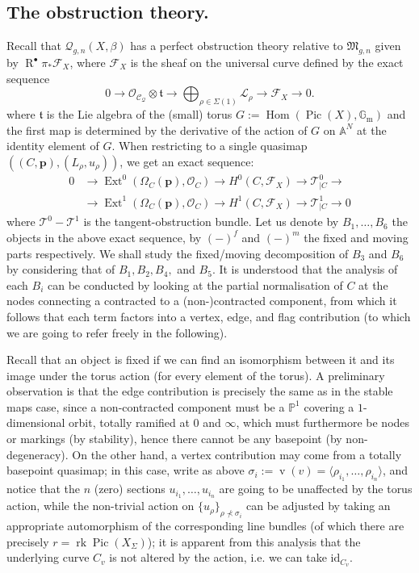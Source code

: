 \documentclass[11pt]{amsart}
\newcommand{\Q}[4]{\mathcal{Q}_{#1,#2}(#3,#4)}
\newcommand{\PP}{\mathbb P}
\newcommand{\OO}{\mathcal{O}}
\renewcommand{\to}{\rightarrow}
\newcommand{\F}{\mathcal F}
\newcommand{\Aaff}{\mathbb{A}}
\newcommand{\Pic}{\operatorname{Pic}}
\newcommand{\Hom}{\operatorname{Hom}}
\newcommand{\Ext}{\operatorname{Ext}}
\newcommand{\Gm}{\mathbb{G}_{\text{m}}}
\newcommand{\R}{\operatorname{R}^{\bullet}}
\newcommand{\rk}{\operatorname{rk}}
\newcommand{\vv}{\operatorname{v}}
\newcommand{\id}{\mathrm{id}}
\theoremstyle{definition}
\theoremstyle{definition}
\begin{document}
\subsection{The obstruction theory.} Recall that $\Q{g}{n}{X}{\beta}$ has a perfect obstruction theory relative to $\mathfrak M_{g,n}$ given by $\R\pi_*\F_X$, where $\F_X$ is the sheaf on the universal curve defined by the exact sequence
\begin{equation}\label{eqn:F}
 0\to\OO_{\mathcal C_\mathcal Q}\otimes \mathfrak t\to\bigoplus_{\rho\in\Sigma(1)}\mathcal L_\rho\to\F_X\to 0.
\end{equation}
where $\mathfrak t$ is the Lie algebra of the (small) torus $G:=\Hom(\Pic(X),\Gm)$ and the first map is determined by the derivative of the action of $G$ on $\Aaff^N$ at the identity element of $G$.
When restricting to a single quasimap $\left((C,\mathbf p),(L_{\rho},u_{\rho})\right)$, we get an exact sequence:
\begin{align*}
 0&\to \Ext^0(\Omega_C(\mathbf p),\OO_C)\to H^0(C,\F_X)\to \mathcal T^0_{|C}\to \\
  &\to \Ext^1(\Omega_C(\mathbf p),\OO_C)\to H^1(C,\F_X)\to \mathcal T^1_{|C}\to 0
\end{align*}
where $\mathcal T^0-\mathcal T^1$ is the tangent-obstruction bundle.
Let us denote by $B_1,\ldots, B_6$ the objects in the above exact sequence, by $(-)^f$ and $(-)^m$ the fixed and moving parts respectively. We shall study the fixed/moving decomposition of $B_3$ and $B_6$ by considering that of $B_1, B_2, B_4,$ and $B_5$. It is understood that the analysis of each $B_i$ can be conducted by looking at the partial normalisation of $C$ at the nodes connecting a contracted to a (non-)contracted component, from which it follows that each term factors into a vertex, edge, and flag contribution (to which we are going to refer freely in the following). 

Recall that an object is fixed if we can find an isomorphism between it and its image under the torus action (for every element of the torus). A preliminary observation is that the edge contribution is precisely the same as in the stable maps case, since a non-contracted component must be a $\PP^1$ covering a $1$-dimensional orbit, totally ramified at $0$ and $\infty$, which must furthermore be nodes or markings (by stability), hence there cannot be any basepoint (by non-degeneracy). On the other hand, a vertex contribution may come from a totally basepoint quasimap; in this case, write as above $\sigma_i:=\vv(v)=\langle \rho_{i_1},\ldots,\rho_{i_n}\rangle$, and notice that the $n$ (zero) sections $u_{i_1},\ldots,u_{i_n}$ are going to be unaffected by the torus action, while the non-trivial action on $\{u_\rho\}_{\rho\nprec\sigma_i}$ can be adjusted by taking an appropriate automorphism of the corresponding line bundles (of which there are precisely $r=\rk\Pic(X_\Sigma)$); it is apparent from this analysis that the underlying curve $C_v$ is not altered by the action, i.e. we can take $\id_{C_v}$.
\end{document}
